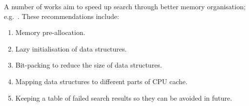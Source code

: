A number of works aim to speed up search through better memory organisation;
e.g.~\citep{rabin00,higgins02,cain02,park04,Cazenave:06}. These
recommendations include:
\begin{enumerate}
\item Memory pre-allocation.
\item Lazy initialisation of data structures.
\item Bit-packing to reduce the size of data structures.
\item Mapping data structures to different parts of CPU cache.
\item Keeping a table of failed search results so they can be avoided in future.
\end{enumerate}
